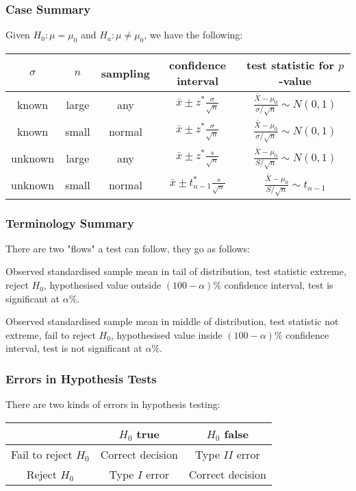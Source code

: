 \documentclass[10pt, a4paper]{article}
\begin{document}
\subsubsection{Case Summary}
Given $H_0 : \mu = \mu_0$ and $H_a : \mu \neq \mu_0$,
we have the following:
\begin{table}[H]
    \centering
    \begin{tabular}{c|c|c|c|c}
         $\sigma$ & $n$ & sampling & confidence interval & test statistic for $p$-value  \\
         \hline
         known & large & any & $\bar{x} \pm z ^ {*}\frac{\sigma}{\sqrt{n}}$ & $\frac{\bar{X} - \mu_0}{\sigma / \sqrt{n}} \sim N(0, 1)$ \\
         known & small & normal & $\bar{x} \pm z ^ {*}\frac{\sigma}{\sqrt{n}}$ & $\frac{\bar{X} - \mu_0}{\sigma / \sqrt{n}} \sim N(0, 1)$ \\
         unknown & large & any & $\bar{x} \pm z ^ {*}\frac{s}{\sqrt{n}}$ & $\frac{\bar{X} - \mu_0}{S / \sqrt{n}} \sim N(0, 1)$ \\
         unknown & small & normal & $\bar{x} \pm t_{n - 1}^{*}\frac{s}{\sqrt{n}}$ & $\frac{\bar{X} - \mu_0}{S / \sqrt{n}} \sim t_{n - 1}$
    \end{tabular}
\end{table}

\subsubsection{Terminology Summary}
There are two "flows" a test can follow,
they go as follows:

Observed standardised sample mean in tail of distribution,
test statistic extreme,
reject $H_0$,
hypothesised value outside $(100 - \alpha)\%$ confidence interval,
test is significant at $\alpha\%$.

Observed standardised sample mean in middle of distribution,
test statistic not extreme,
fail to reject $H_0$,
hypothesised value inside $(100 - \alpha)\%$ confidence interval,
test is not significant at $\alpha\%$.

\subsubsection{Errors in Hypothesis Tests}
There are two kinds of errors in hypothesis testing:

\begin{table}[H]
    \centering
    \begin{tabular}{c|c|c}
         & $H_0$ true & $H_0$ false \\
         \hline
         Fail to reject $H_0$ & Correct decision & Type $II$ error \\
         Reject $H_0$ & Type $I$ error & Correct decision
    \end{tabular}
\end{table}
\end{document}
